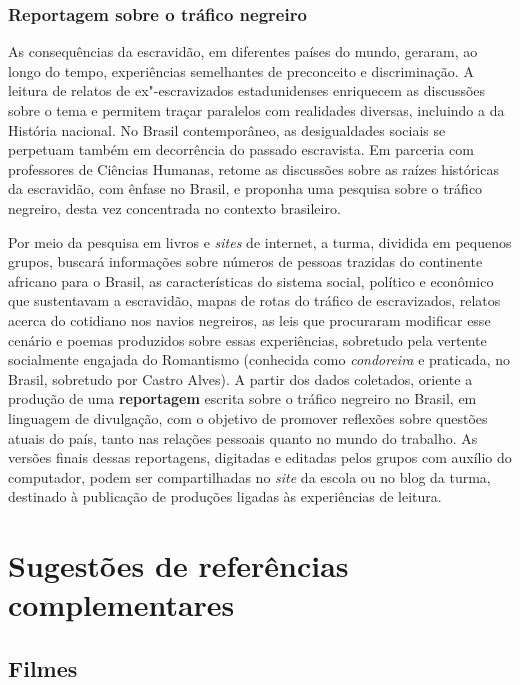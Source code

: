 \documentclass[11pt]{extarticle}
\begin{document}
\subsubsection{Reportagem sobre o tráfico negreiro}


  As consequências da escravidão, em diferentes países do mundo,
  geraram, ao longo do tempo, experiências semelhantes de preconceito e
  discriminação. A leitura de relatos de ex"-escravizados estadunidenses
  enriquecem as discussões sobre o tema e permitem traçar paralelos com
  realidades diversas, incluindo a da História nacional. No Brasil
  contemporâneo, as desigualdades sociais se perpetuam também em
  decorrência do passado escravista. Em parceria com professores de
  Ciências Humanas, retome as discussões sobre as raízes históricas da
  escravidão, com ênfase no Brasil, e proponha uma pesquisa sobre o
  tráfico negreiro, desta vez concentrada no contexto brasileiro. 

  Por meio da pesquisa em livros e \emph{sites} de internet, a turma,
  dividida em pequenos grupos, buscará informações sobre números de
  pessoas trazidas do continente africano para o Brasil, as
  características do sistema social, político e econômico que
  sustentavam a escravidão, mapas de rotas do tráfico de escravizados,
  relatos acerca do cotidiano nos navios negreiros, as leis que
  procuraram modificar esse cenário e poemas produzidos sobre essas
  experiências, sobretudo pela vertente socialmente engajada do
  Romantismo (conhecida como \emph{condoreira} e praticada, no Brasil,
  sobretudo por Castro Alves). A partir dos dados coletados, oriente a
  produção de uma \textbf{reportagem} escrita sobre o tráfico negreiro
  no Brasil, em linguagem de divulgação, com o objetivo de promover
  reflexões sobre questões atuais do país, tanto nas relações pessoais
  quanto no mundo do trabalho. As versões finais dessas reportagens,
  digitadas e editadas pelos grupos com auxílio do computador, podem ser
  compartilhadas no \emph{site} da escola ou no blog da turma, destinado
  à publicação de produções ligadas às experiências de leitura.



\section{Sugestões de referências complementares}\label{sugestoes}


\subsection{Filmes}
\end{document}
